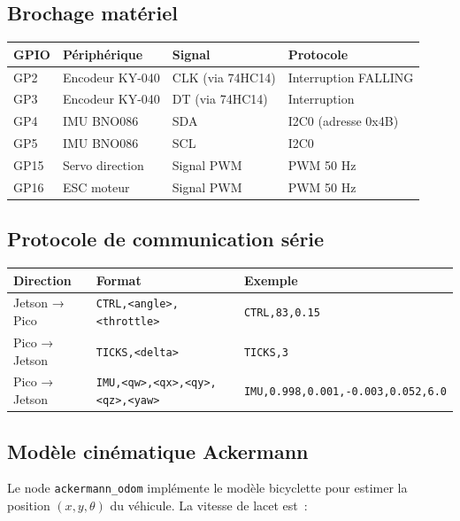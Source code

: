 \documentclass[a4paper,11pt]{article}
\begin{document}
\subsection{Brochage matériel}

\begin{center}
\begin{tabular}{llll}
\toprule
\textbf{GPIO} & \textbf{Périphérique} & \textbf{Signal} & \textbf{Protocole} \\
\midrule
GP2  & Encodeur KY-040 & CLK (via 74HC14) & Interruption FALLING \\
GP3  & Encodeur KY-040 & DT (via 74HC14)  & Interruption \\
GP4  & IMU BNO086      & SDA              & I2C0 (adresse 0x4B) \\
GP5  & IMU BNO086      & SCL              & I2C0 \\
GP15 & Servo direction & Signal PWM       & PWM 50 Hz \\
GP16 & ESC moteur      & Signal PWM       & PWM 50 Hz \\
\bottomrule
\end{tabular}
\end{center}

\subsection{Protocole de communication série}

\begin{center}
\begin{tabular}{lll}
\toprule
\textbf{Direction} & \textbf{Format} & \textbf{Exemple} \\
\midrule
Jetson → Pico & \texttt{CTRL,<angle>,<throttle>} & \texttt{CTRL,83,0.15} \\
Pico → Jetson & \texttt{TICKS,<delta>}            & \texttt{TICKS,3} \\
Pico → Jetson & \texttt{IMU,<qw>,<qx>,<qy>,<qz>,<yaw>} & \texttt{IMU,0.998,0.001,-0.003,0.052,6.0} \\
\bottomrule
\end{tabular}
\end{center}

\subsection{Modèle cinématique Ackermann}

Le node \texttt{ackermann\_odom} implémente le modèle bicyclette pour estimer la
position $(x, y, \theta)$ du véhicule. La vitesse de lacet est~:
\end{document}
